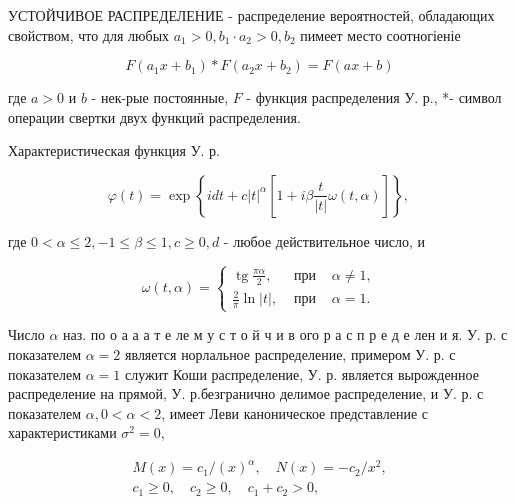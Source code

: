 \documentclass[10pt]{article}
\begin{document}
УСТОЙЧИВОЕ РАСПРЕДЕЛЕНИЕ - распределение вероятностей, обладающих свойством, что для любых $a_{1}>0, b_{1} \cdot a_{2}>0, b_{2}$ пимеет место соотногіеніе



\[

F\left(a_{1} x+b_{1}\right) * F\left(a_{2} x+b_{2}\right)=F(a x+b)

\]



где $a>0$ и $b$ - нек-рые постоянные, $F$ - функция распределения У. р., *- символ операции свертки двух функциӥ распределения.



Характеристическая функция У. р.



\[

\varphi(t)=\exp \left\{i d t+c|t|^{\alpha}\left[1+i \beta \frac{t}{|t|} \omega(t, \alpha)\right]\right\} \text {, }

\]



где $0<\alpha \leqslant 2,-1 \leqslant \beta \leqslant 1, c \geqslant 0, d$ - любое действительное число, и



\[

\omega(t, \alpha)=\left\{\begin{array}{lll}

\operatorname{tg} \frac{\pi \alpha}{2}, & \text { при } & \alpha \neq 1, \\

\frac{2}{\pi} \ln |t|, & \text { при } & \alpha=1 .

\end{array}\right.

\]



Число $\alpha$ наз. по о а $а$ а т е ле м у с т о й ч и в ого р а с п р е д е лен и я. У. р. с показателем $\alpha=2$ является норлальное распределение, примером У. р. с показателем $\alpha=1$ служит Коши распределение, У. р. является вырожденное распределение на прямой, У. р.безгранично делимое распределение, и У. р. с показателем $\alpha, 0<\alpha<2$, имеет Леви каноническое представление с характеристиками $\sigma^{2}=0$,



\[

\begin{gathered}

M(x)=c_{1} /(x)^{\alpha}, \quad N(x)=-c_{2} / x^{2}, \\

c_{1} \geqslant 0, \quad c_{2} \geqslant 0, \quad c_{1}+c_{2}>0,

\end{gathered}

\]
\end{document}
